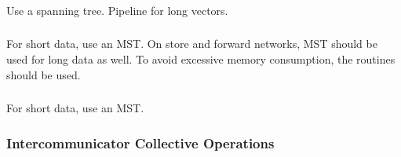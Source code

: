 \documentclass{article}
\begin{document}
\subsubsection{}
Use a spanning tree.  Pipeline for long vectors.

\subsubsection{}
For short data, use an MST. On store and forward networks, MST should be used
for long data as well.  To avoid excessive memory consumption, the
 routines should be used.

\subsubsection{}
For short data, use an MST. 

\subsubsection{Intercommunicator Collective Operations}
\subsubsection{}
\subsubsection{}
\subsubsection{}
\subsubsection{}
\subsubsection{}
\subsubsection{}
\subsubsection{}
\end{document}
